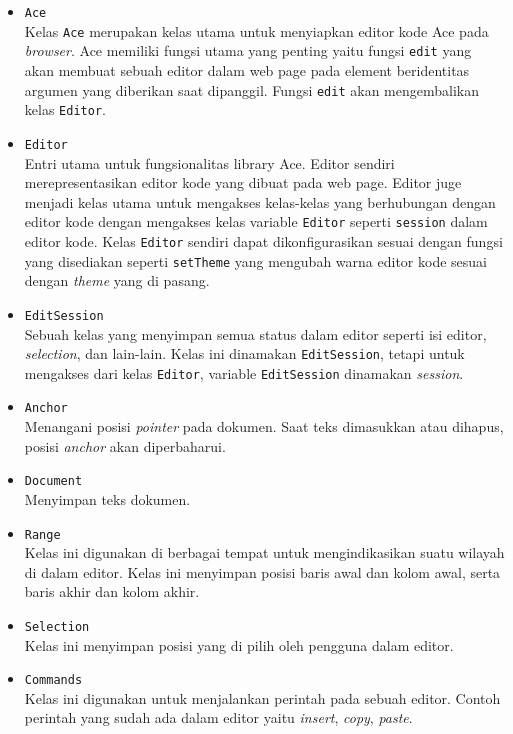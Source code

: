 \begin{itemize}
	\item \verb|Ace| \\
	      Kelas \verb|Ace| merupakan kelas utama untuk menyiapkan editor kode Ace pada \textit{browser}. Ace memiliki fungsi utama yang penting yaitu fungsi \verb|edit| yang akan membuat sebuah editor dalam web page pada element beridentitas argumen yang diberikan saat dipanggil. Fungsi \verb|edit| akan mengembalikan kelas \verb|Editor|.
	\item \verb|Editor| \\
	      Entri utama untuk fungsionalitas library Ace. Editor sendiri merepresentasikan editor kode yang dibuat pada web page. Editor juge menjadi kelas utama untuk mengakses kelas-kelas yang berhubungan dengan editor kode dengan mengakses kelas variable \verb|Editor| seperti \verb|session| dalam editor kode. Kelas \verb|Editor| sendiri dapat dikonfigurasikan sesuai dengan fungsi yang disediakan seperti \verb|setTheme| yang mengubah warna editor kode sesuai dengan \textit{theme} yang di pasang. 
	\item \verb|EditSession| \\
	      Sebuah kelas yang menyimpan semua status dalam editor seperti isi editor, \textit{selection}, dan lain-lain. Kelas ini dinamakan \verb|EditSession|, tetapi untuk mengakses dari kelas \verb|Editor|, variable \verb|EditSession| dinamakan \textit{session}.
	\item \verb|Anchor| \\
	      Menangani posisi \textit{pointer} pada dokumen. Saat teks dimasukkan atau dihapus, posisi \textit{anchor} akan diperbaharui.
	\item \verb|Document| \\
	      Menyimpan teks dokumen.
	\item \verb|Range| \\
	      Kelas ini digunakan di berbagai tempat untuk mengindikasikan suatu wilayah di dalam editor. Kelas ini menyimpan posisi baris awal dan kolom awal, serta baris akhir dan kolom akhir.
	\item \verb|Selection| \\
	      Kelas ini menyimpan posisi yang di pilih oleh pengguna dalam editor.
	\item \verb|Commands| \\
	      Kelas ini digunakan untuk menjalankan perintah pada sebuah editor. Contoh perintah yang sudah ada dalam editor yaitu \textit{insert}, \textit{copy}, \textit{paste}.
\end{itemize}

